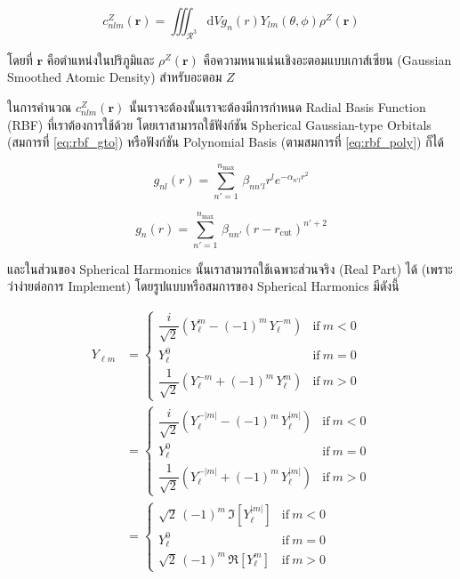 \begin{equation}
    c^{Z}_{nlm}(\mathbf{r}) = \iiint_{\mathcal{R}^{3}} \mathrm{d}V g_{n}(r) Y_{lm}(\theta, \phi) 
    \rho^{Z}(\mathbf{r})
\end{equation}

\noindent โดยที่ $\mathbf{r}$ คือตำแหน่งในปริภูมิและ $\rho^Z(\mathbf{r})$ คือความหนาแน่นเชิงอะตอมแบบเกาส์เซียน (Gaussian 
Smoothed Atomic Density) สำหรับอะตอม $Z$ 

ในการคำนวณ $c^{Z}_{nlm}(\mathbf{r})$ นั้นเราจะต้องนั้นเราจะต้องมีการกำหนด Radial Basis Function (RBF) ที่เราต้องการใช้ด้วย 
โดยเราสามารถใช้ฟังก์ชัน Spherical Gaussian-type Orbitals (สมการที่ \ref{eq:rbf_gto}) หรือฟังก์ชัน Polynomial Basis 
(ตามสมการที่ \ref{eq:rbf_poly}) ก็ได้

\begin{equation}\label{eq:rbf_gto}
    g_{nl}(r) = \sum_{n'=1}^{n_\mathrm{max}}\,\beta_{nn'l} r^l e^{-\alpha_{n'l}r^2}
\end{equation}

\begin{equation}\label{eq:rbf_poly}
    g_{n}(r) = \sum_{n'=1}^{n_\mathrm{max}}\,\beta_{nn'} (r-r_\mathrm{cut})^{n'+2}
\end{equation}

\noindent และในส่วนของ Spherical Harmonics นั้นเราสามารถใช้เฉพาะส่วนจริง (Real Part) ได้ (เพราะว่าง่ายต่อการ Implement) 
โดยรูปแบบหรือสมการของ Spherical Harmonics มีดังนี้

\begin{align}\label{eq:spher_harmo}
    Y_{\ell m} &= \begin{cases}
    \dfrac{i}{\sqrt{2}} \left(Y_\ell^{m} - (-1)^m\, Y_\ell^{-m}\right) & \text{if}\ m < 0 \\
    Y_\ell^0 & \text{if}\ m=0 \\
    \dfrac{1}{\sqrt{2}} \left(Y_\ell^{-m} + (-1)^m\, Y_\ell^{m}\right) & \text{if}\ m > 0
    \end{cases} \\
    &= \begin{cases}
    \dfrac{i}{\sqrt{2}} \left(Y_\ell^{-|m|} - (-1)^{m}\, Y_\ell^{|m|}\right) & \text{if}\ m < 0 \\
    Y_\ell^0 & \text{if}\ m=0 \\
    \dfrac{1}{\sqrt{2}} \left(Y_\ell^{-|m|} + (-1)^{m}\, Y_\ell^{|m|}\right) & \text{if}\ m>0
    \end{cases} \\
    &= \begin{cases}
    \sqrt{2} \, (-1)^m \, \Im [{Y_\ell^{|m|}}] & \text{if}\ m<0 \\
    Y_\ell^0 & \text{if}\ m=0 \\
    \sqrt{2} \, (-1)^m \, \Re [{Y_\ell^m}] & \text{if}\ m>0
    \end{cases}
\end{align}

